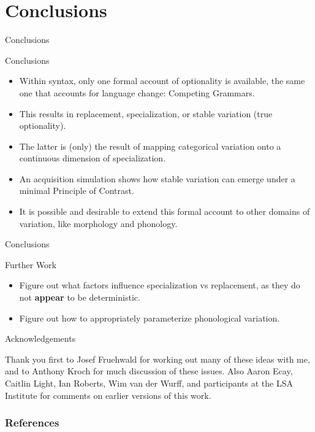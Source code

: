 \documentclass[hyperref={pdfpagelabels=false}]{beamer}
\begin{document}
\section{Conclusions}
\begin{frame}{Conclusions}
	\begin{block}{Conclusions}
		\begin{itemize}
			\item Within syntax, only one formal account of optionality is available, the same one that accounts for language change: Competing Grammars.
			\item This results in replacement, specialization, or stable variation (true optionality).
			\item The latter is (only) the result of mapping categorical variation onto a continuous dimension of specialization.
			\item An acquisition simulation shows how stable variation can emerge under a minimal Principle of Contrast.
			\item It is possible and desirable to extend this formal account to other domains of variation, like morphology and phonology.
		\end{itemize}
	\end{block}


\end{frame}

\begin{frame}{Conclusions}
	\begin{block}{Further Work}
		\begin{itemize}
			\item Figure out what factors influence specialization vs replacement, as they do not \textbf{appear} to be deterministic.
			\item Figure out how to appropriately parameterize phonological variation.
		\end{itemize}
	\end{block}

\end{frame}

\begin{frame}{Acknowledgements}
\begin{center}
Thank you first to Josef Fruehwald for working out many of these ideas with me, and to Anthony Kroch for much discussion of these issues. Also Aaron Ecay, Caitlin Light, Ian Roberts, Wim van der Wurff, and participants at the LSA Institute for comments on earlier versions of this work. 
\end{center}
\end{frame}


\begin{frame}[allowframebreaks]
\frametitle{References}
\newcommand*{\newblock}{natbib}


\end{frame}
\end{document}
